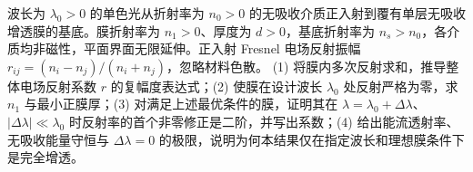 波长为 \(\lambda_0>0\) 的单色光从折射率为 \(n_0>0\) 的无吸收介质正入射到覆有单层无吸收增透膜的基底。膜折射率为 \(n_1>0\)、厚度为 \(d>0\)，基底折射率为 \(n_s>n_0\)，各介质均非磁性，平面界面无限延伸。正入射 Fresnel 电场反射振幅 \(r_{ij}=(n_i-n_j)/(n_i+n_j)\)，忽略材料色散。
(1) 将膜内多次反射求和，推导整体电场反射系数 \(r\) 的复幅度表达式；(2) 使膜在设计波长 \(\lambda_0\) 处反射严格为零，求 \(n_1\) 与最小正膜厚；(3) 对满足上述最优条件的膜，证明其在 \(\lambda=\lambda_0+\Delta\lambda\)、\(|\Delta\lambda|\ll\lambda_0\) 时反射率的首个非零修正是二阶，并写出系数；(4) 给出能流透射率、无吸收能量守恒与 \(\Delta\lambda=0\) 的极限，说明为何本结果仅在指定波长和理想膜条件下是完全增透。
